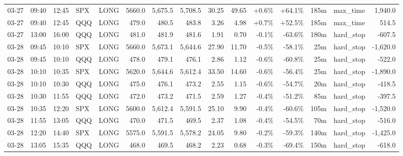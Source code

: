 \documentclass[11pt,a4paper,twoside]{article}
\begin{document}
\begin{landscape}
\begin{center}
\begin{longtable}{>{\color{txtmain}}l l l l l r r r r r r r r >{\color{txtmain}}l r}
03-27 & 09:40 & 12:45 & SPX & LONG & 5660.0 & 5,675.5 & 5,708.5 & 30.25 & 49.65 & \textcolor{wingreen}{+0.6\%} & \textcolor{wingreen}{+64.1\%} & 185m & max\_time & \textcolor{wingreen}{1,940.0} \\
03-27 & 09:40 & 12:45 & QQQ & LONG & 479.0 & 480.5 & 483.8 & 3.26 & 4.98 & \textcolor{wingreen}{+0.7\%} & \textcolor{wingreen}{+52.5\%} & 185m & max\_time & \textcolor{wingreen}{514.5} \\
03-27 & 13:00 & 16:00 & QQQ & LONG & 481.0 & 481.9 & 481.6 & 1.91 & 0.70 & \textcolor{lossred}{-0.1\%} & \textcolor{lossred}{-63.6\%} & 180m & hard\_stop & \textcolor{lossred}{-607.5} \\
03-28 & 09:45 & 10:10 & SPX & LONG & 5660.0 & 5,673.1 & 5,644.6 & 27.90 & 11.70 & \textcolor{lossred}{-0.5\%} & \textcolor{lossred}{-58.1\%} & 25m & hard\_stop & \textcolor{lossred}{-1,620.0} \\
03-28 & 09:45 & 10:10 & QQQ & LONG & 478.0 & 479.1 & 476.1 & 2.86 & 1.12 & \textcolor{lossred}{-0.6\%} & \textcolor{lossred}{-60.8\%} & 25m & hard\_stop & \textcolor{lossred}{-522.0} \\
03-28 & 10:10 & 10:35 & SPX & LONG & 5620.0 & 5,644.6 & 5,612.4 & 33.50 & 14.60 & \textcolor{lossred}{-0.6\%} & \textcolor{lossred}{-56.4\%} & 25m & hard\_stop & \textcolor{lossred}{-1,890.0} \\
03-28 & 10:10 & 10:30 & QQQ & LONG & 475.0 & 476.1 & 473.2 & 2.55 & 1.15 & \textcolor{lossred}{-0.6\%} & \textcolor{lossred}{-54.7\%} & 20m & hard\_stop & \textcolor{lossred}{-418.5} \\
03-28 & 10:30 & 11:55 & QQQ & LONG & 472.0 & 473.2 & 471.5 & 2.59 & 1.27 & \textcolor{lossred}{-0.4\%} & \textcolor{lossred}{-51.2\%} & 85m & hard\_stop & \textcolor{lossred}{-397.5} \\
03-28 & 10:35 & 12:20 & SPX & LONG & 5600.0 & 5,612.4 & 5,591.5 & 25.10 & 9.90 & \textcolor{lossred}{-0.4\%} & \textcolor{lossred}{-60.6\%} & 105m & hard\_stop & \textcolor{lossred}{-1,520.0} \\
03-28 & 11:55 & 13:05 & QQQ & LONG & 470.0 & 471.5 & 469.5 & 2.37 & 1.08 & \textcolor{lossred}{-0.4\%} & \textcolor{lossred}{-54.5\%} & 70m & hard\_stop & \textcolor{lossred}{-516.0} \\
03-28 & 12:20 & 14:40 & SPX & LONG & 5575.0 & 5,591.5 & 5,578.2 & 24.05 & 9.80 & \textcolor{lossred}{-0.2\%} & \textcolor{lossred}{-59.3\%} & 140m & hard\_stop & \textcolor{lossred}{-1,425.0} \\
03-28 & 13:05 & 15:35 & QQQ & LONG & 468.0 & 469.5 & 468.2 & 2.23 & 0.68 & \textcolor{lossred}{-0.3\%} & \textcolor{lossred}{-69.4\%} & 150m & hard\_stop & \textcolor{lossred}{-618.0} \\

\end{longtable}
\end{center}
\end{landscape}
\end{document}
